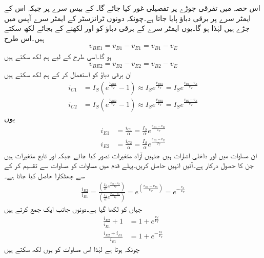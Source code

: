 اس حصہ میں تفرقی جوڑے پر تفصیلی غور کیا جائے گا۔  کے بیس  سرے پر  جبکہ اس کے ایمٹر سرے پر  برقی دباؤ پایا جاتا ہے۔چونکہ دونوں ٹرانزسٹر کے ایمٹر سرے آپس میں جڑے ہیں لہٰذا  ہو گا۔یوں ایمٹر سرے کے برقی دباؤ کو  اور  لکھنے کے بجائے  لکھ سکتے ہیں۔اس طرح
\begin{align}
v_{BE1}=v_{B1}-v_{E1}=v_{B1}-v_E
\end{align}
ہو گا۔اسی طرح  کے لیے ہم لکھ سکتے ہیں
\begin{align}
v_{BE2}=v_{B2}-v_{E2}=v_{B2}-v_E
\end{align}
ان برقی دباؤ کو استعمال کر کے ہم لکھ سکتے ہیں
\begin{align}
i_{C1}&=I_S \left(e^{\frac{v_{BE1}}{V_T}}-1 \right ) \approx I_S e^{\frac{v_{BE1}}{V_T}} =I_S e^{\frac{v_{B1}-v_E}{V_T}}\\
i_{C2}&=I_S \left(e^{\frac{v_{BE2}}{V_T}}-1 \right ) \approx I_S e^{\frac{v_{BE2}}{V_T}} =I_S e^{\frac{v_{B2}-v_E}{V_T}}
\end{align}
یوں
\begin{align}
i_{E1}&=\frac{i_{C1}}{\alpha}=\frac{I_S}{\alpha} e^{\frac{v_{B1}-v_E}{V_T}} \label{مساوات_تفرقی_پہلی_رو_بالمقابل_دباو}\\
i_{E2}&=\frac{i_{C2}}{\alpha}=\frac{I_S}{\alpha} e^{\frac{v_{B2}-v_E}{V_T}} \label{مساوات_تفرقی_دوسری_رو_بالمقابل_دباو}
\end{align}
ان مساوات میں   اور  داخلی اشارات ہیں جنہیں آزاد متغیرات تصور کیا جائے  جبکہ  اور   تابع متغیرات ہیں جن کا حصول درکار ہے۔آئیں انہیں حاصل کریں۔پہلے قدم میں مساوات   کو مساوات   سے تقسیم کر کے  سے چھٹکارا حاصل کیا جاتا ہے۔
\begin{align}
\frac{i_{E2}}{i_{E1}}=\frac{\left(\frac{I_S}{\alpha} e^{\frac{v_{B2}-v_E}{V_T}}\right )}{\left(\frac{I_S}{\alpha} e^{\frac{v_{B1}-v_E}{V_T}}\right )}=e^{\left(\frac{v_{B2}-v_{B1}}{V_T} \right )}=e^{-\frac{v_d}{V_T}}
\end{align}
جہاں   کو  لکھا گیا ہے۔دونوں جانب ایک    جمع کرتے ہیں
\begin{align}
\frac{i_{E2}}{i_{E1}}+1&=1+ e^{\frac{v_d}{V_T}}\\
\frac{i_{E2}+i_{E1}}{i_{E1}}&=1+e^{-\frac{v_d}{V_T}}
\end{align}
چونکہ  ہوتا ہے لہٰذا اس مساوات کو یوں لکھ سکتے ہیں
